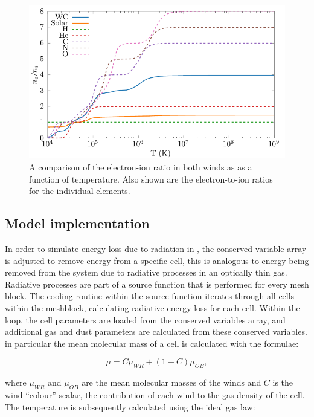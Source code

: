 \begin{figure}[h]
  \centering
  \includegraphics{assets/ionisation-fraction/ionisation-fraction.pdf}
  \caption[OB and WR electron-ion ratios]{A comparison of the electron-ion ratio in both winds as as a function of temperature. Also shown are the electron-to-ion ratios for the individual elements.}
  \label{fig:electron-curve-no-elements}
\end{figure}

\subsection{Model implementation}
\label{sec:cooling-implementation}

In order to simulate energy loss due to radiation in \athena{}, the conserved variable array is adjusted to remove energy from a specific cell, this is analogous to energy being removed from the system due to radiative processes in an optically thin gas.
Radiative processes are part of a source function that is performed for every mesh block.
The cooling routine within the source function iterates through all cells within the meshblock, calculating radiative energy loss for each cell.
Within the loop, the cell parameters are loaded from the conserved variables array, and additional gas and dust parameters are calculated from these conserved variables.
in particular the mean molecular mass of a cell is calculated with the formulae:

\begin{equation}
  \mu = C\mu_{WR} + (1-C) \mu_{OB}, \label{eq:windaveraging}
\end{equation}

\noindent
where $\mu_{WR}$ and $\mu_{OB}$ are the mean molecular masses of the winds and $C$ is the wind ``colour'' scalar, the contribution of each wind to the gas density of the cell.
The temperature is subsequently calculated using the ideal gas law:

